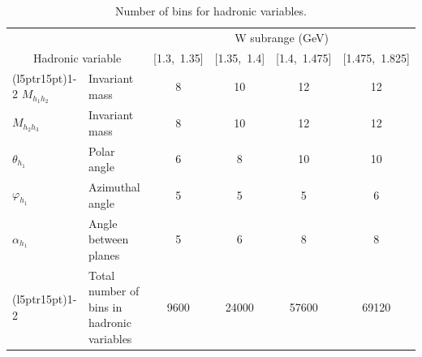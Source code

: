 \vspace{0.5em}
\begin{table}[htb]
\centering 
  \caption{Number of bins for hadronic variables.} \label{tab:summary_bins}
  \begin{tabular}{lm{4cm}cccc}
    \toprule
    & & \multicolumn{4}{c}{W subrange (GeV)} \\
    \multicolumn{2}{c}{\centering Hadronic variable }  & [1.3,~1.35] & [1.35,~1.4] & [1.4,~1.475] & [1.475,~1.825] \\
    \cmidrule(l{5pt}r{15pt}){1-2} \cmidrule(l{5pt}r{5pt}){3-6}
    $M_{h_{1}h_{2}}$   & Invariant mass       &   8  & 10 & 12 & 12  \\
    $M_{h_{2}h_{3}}$   & Invariant mass       &   8  & 10 & 12 & 12  \\
    $\theta_{h_{1}}$   & Polar angle          &   6  & 8  & 10 & 10  \\
    $\varphi_{h_{1}}$  & Azimuthal angle      &   5  & 5  & 5  & 6   \\
    $\alpha_{h_{1}}$   & Angle between planes &   5  & 6  & 8  & 8   \\
    \cmidrule(l{5pt}r{15pt}){1-2} \cmidrule(l{5pt}r{5pt}){3-6}
              & Total number of bins \newline in hadronic variables &   9600  & 24000  & 57600  & 69120   \\
    \bottomrule
  \end{tabular}
\end{table}
\vspace{0.5em}

